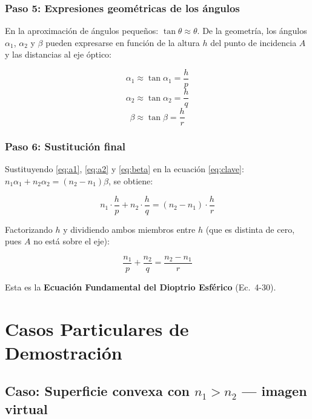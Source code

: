\documentclass[12pt, a4paper]{article}
\theoremstyle{definition}
\begin{document}
\subsubsection*{Paso 5: Expresiones geométricas de los ángulos}

En la aproximación de ángulos pequeños: \(\tan\theta \approx \theta\). De la geometría,
los ángulos \(\alpha_1\), \(\alpha_2\) y \(\beta\) pueden expresarse en función de la
altura \(h\) del punto de incidencia \(A\) y las distancias al eje óptico:

\begin{equation}
  \alpha_1 \approx \tan\alpha_1 = \frac{h}{p}
  \label{eq:a1}
\end{equation}
\begin{equation}
  \alpha_2 \approx \tan\alpha_2 = \frac{h}{q}
  \label{eq:a2}
\end{equation}
\begin{equation}
  \beta \approx \tan\beta = \frac{h}{r}
  \label{eq:beta}
\end{equation}

\subsubsection*{Paso 6: Sustitución final}

Sustituyendo \eqref{eq:a1}, \eqref{eq:a2} y \eqref{eq:beta} en la ecuación
\eqref{eq:clave}: \(n_1\alpha_1 + n_2\alpha_2 = (n_2 - n_1)\beta\), se obtiene:

\[
  n_1 \cdot \frac{h}{p} + n_2 \cdot \frac{h}{q} = (n_2 - n_1) \cdot \frac{h}{r}
\]

Factorizando \(h\) y dividiendo ambos miembros entre \(h\) (que es distinta de cero, pues
\(A\) no está sobre el eje):

\begin{equation}
  \boxed{\frac{n_1}{p} + \frac{n_2}{q} = \frac{n_2 - n_1}{r}}
  \label{eq:fundamental}
\end{equation}

Esta es la \textbf{Ecuación Fundamental del Dioptrio Esférico} (Ec.\ 4-30).

\section{Casos Particulares de Demostración}

\subsection{Caso: Superficie convexa con \texorpdfstring{\(n_1 > n_2\)}{n1 > n2}
            --- imagen virtual}
\end{document}
